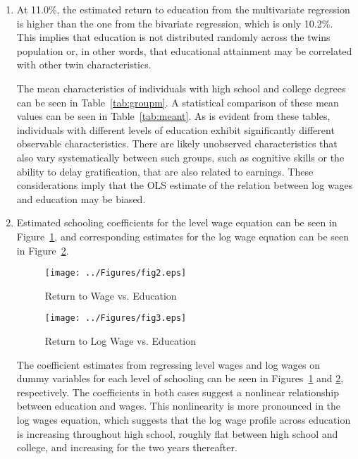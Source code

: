 \documentclass{article}
\begin{document}
\begin{enumerate}
\begin{enumerate}
\item At 11.0\%, the estimated return to education from the multivariate regression is higher than the one from the bivariate regression, which is only 10.2\%. This implies that education is not distributed randomly across the twins population or, in other words, that educational attainment may be correlated with other twin characteristics.


 
The mean characteristics of individuals with high school and college degrees can be seen in Table~\ref{tab:groupm}. A statistical comparison of these mean values can be seen in Table~\ref{tab:meant}. As is evident from these tables, individuals with different levels of education exhibit significantly different observable characteristics. There are likely unobserved characteristics that also vary systematically between such groups, such as cognitive skills or the ability to delay gratification, that are also related to earnings. These considerations imply that the OLS estimate of the relation between log wages and education may be biased.



\item  Estimated schooling coefficients for the level wage equation can be seen in Figure~\ref{fig:hw_ed_dreg}, and corresponding estimates for the log wage equation can be seen in Figure~\ref{fig:lw_ed_dreg}.

\begin{figure}[htbp!]
\centering
\texttt{[image: ../Figures/fig2.eps]}
\caption{Return to Wage vs. Education}
\label{fig:hw_ed_dreg}
\end{figure}

\begin{figure}[htbp!]
\centering
\texttt{[image: ../Figures/fig3.eps]}
\caption{Return to Log Wage vs. Education}
\label{fig:lw_ed_dreg}
\end{figure}

The coefficient estimates from regressing level wages and log wages on dummy variables for each level of schooling can be seen in Figures~\ref{fig:hw_ed_dreg} and \ref{fig:lw_ed_dreg}, respectively. The coefficients in both cases suggest a nonlinear relationship between education and wages. This nonlinearity is more pronounced in the log wages equation, which suggests that the log wage profile across education is increasing throughout high school, roughly flat between high school and college, and increasing for the two years thereafter.


\end{enumerate}
\end{enumerate}
\end{document}
